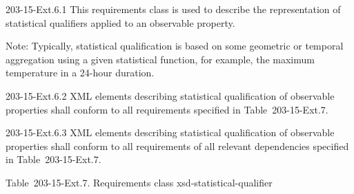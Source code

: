 203-15-Ext.6.1 This requirements class is used to describe the representation of statistical qualifiers applied to an observable property.

Note: Typically, statistical qualification is based on some geometric or temporal aggregation using a given statistical function, for example, the maximum temperature in a 24-hour duration.

203-15-Ext.6.2 XML elements describing statistical qualification of observable properties shall conform to all requirements specified in Table~203-15-Ext.7.

203-15-Ext.6.3 XML elements describing statistical qualification of observable properties shall conform to all requirements of all relevant dependencies specified in Table~203-15-Ext.7.

Table~203-15-Ext.7. Requirements class xsd-statistical-qualifier

